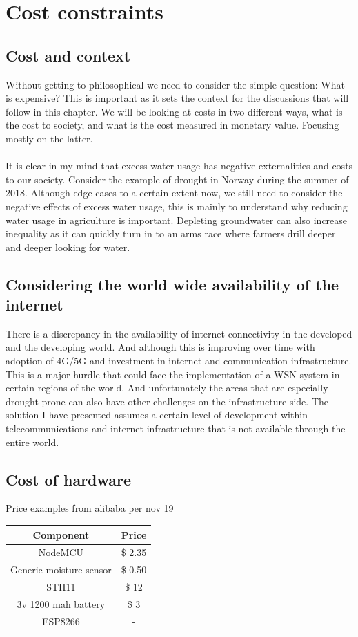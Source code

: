 \documentclass[]{uiophd}
\begin{document}
\chapter{Cost constraints}

\section{Cost and context}
Without getting to philosophical we need to consider the simple question: What is expensive? This is important as it sets the context for the discussions that will follow in this chapter. We will be looking at costs in two different ways, what is the cost to society, and what is the cost measured in monetary value. Focusing mostly on the latter. 
\\\\
It is clear in my mind that excess water usage has negative externalities and costs to our society. Consider the  example of drought in Norway during the summer of 2018. Although edge cases to a certain extent now, we still need to consider the negative effects of excess water usage, this is mainly to understand why reducing water usage in agriculture is important. Depleting groundwater can also increase inequality as it can quickly turn in to an arms race where farmers drill deeper and deeper looking for water.
\section{Considering the world wide availability of the internet}
There is a discrepancy in the availability of internet connectivity in the developed and the developing world. And although this is improving over time with adoption of 4G/5G and investment in internet and communication infrastructure. This is a major hurdle that could face the implementation of a WSN system in certain regions of the world. And unfortunately the areas that are especially drought prone can also have other challenges on the infrastructure side. The solution I have presented assumes a certain level of development within telecommunications and internet infrastructure that is not available through the entire world.
\section{Cost of hardware}

Price examples from alibaba per nov 19

\begin{center}
 \begin{tabular}{||c | c||} 
 \hline
 Component & Price \\ [0.5ex] 
 \hline\hline
 NodeMCU & \$ 2.35 \\ 
 \hline
 Generic moisture sensor & \$ 0.50 \\
 \hline
 STH11 & \$ 12 \\
 \hline
 3v 1200 mah battery & \$ 3 \\
 \hline
 ESP8266 & - \\ [1ex] 
 \hline
\end{tabular}
\end{center}
\end{document}
